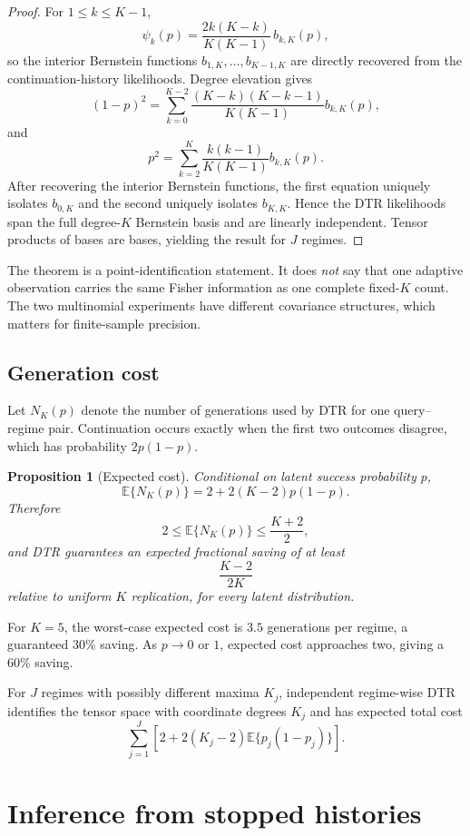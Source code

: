\documentclass[11pt]{article}
\newtheorem{proposition}{Proposition}
\theoremstyle{remark}
\newcommand{\E}{\mathbb{E}}
\begin{document}
\begin{proof}
For $1\le k\le K-1$,
\[
 \psi_k(p)=\frac{2k(K-k)}{K(K-1)}\,b_{k,K}(p),
\]
so the interior Bernstein functions $b_{1,K},\ldots,b_{K-1,K}$ are directly recovered from the continuation-history likelihoods. Degree elevation gives
\[
 (1-p)^2=\sum_{k=0}^{K-2}\frac{(K-k)(K-k-1)}{K(K-1)}b_{k,K}(p),
\]
and
\[
 p^2=\sum_{k=2}^{K}\frac{k(k-1)}{K(K-1)}b_{k,K}(p).
\]
After recovering the interior Bernstein functions, the first equation uniquely isolates $b_{0,K}$ and the second uniquely isolates $b_{K,K}$. Hence the DTR likelihoods span the full degree-$K$ Bernstein basis and are linearly independent. Tensor products of bases are bases, yielding the result for $J$ regimes.\qedhere
\end{proof}

The theorem is a point-identification statement. It does \emph{not} say that one adaptive observation carries the same Fisher information as one complete fixed-$K$ count. The two multinomial experiments have different covariance structures, which matters for finite-sample precision.

\subsection{Generation cost}

Let $N_K(p)$ denote the number of generations used by DTR for one query--regime pair. Continuation occurs exactly when the first two outcomes disagree, which has probability $2p(1-p)$.

\begin{proposition}[Expected cost]\label{prop:cost}
Conditional on latent success probability $p$,
\[
 \E\{N_K(p)\}=2+2(K-2)p(1-p).
\]
Therefore
\[
 2\le \E\{N_K(p)\}\le \frac{K+2}{2},
\]
and DTR guarantees an expected fractional saving of at least
\[
 \frac{K-2}{2K}
\]
relative to uniform $K$ replication, for every latent distribution.
\end{proposition}

For $K=5$, the worst-case expected cost is $3.5$ generations per regime, a guaranteed 30\% saving. As $p\to0$ or $1$, expected cost approaches two, giving a 60\% saving.

For $J$ regimes with possibly different maxima $K_j$, independent regime-wise DTR identifies the tensor space with coordinate degrees $K_j$ and has expected total cost
\[
 \sum_{j=1}^J\left[2+2(K_j-2)\E\{p_j(1-p_j)\}\right].
\]

\section{Inference from stopped histories}
\end{document}
